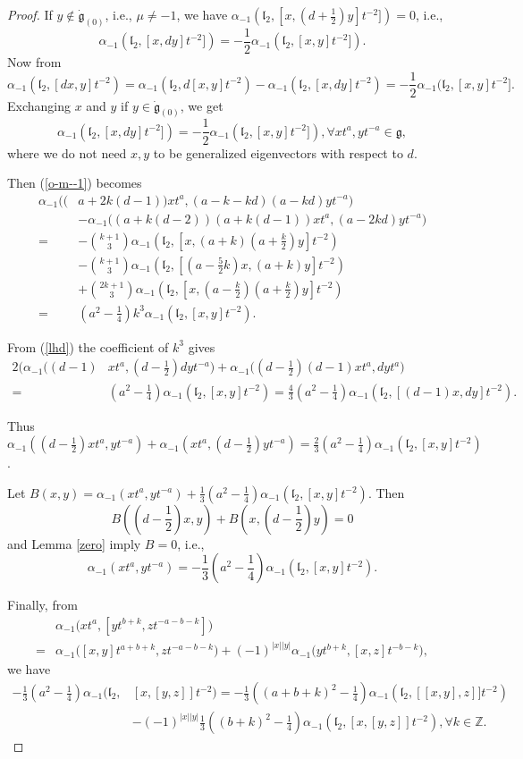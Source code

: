 \documentclass[1p]{elsarticle}
\numberwithin{equation}{section}
\def\dg{\dot{\mathfrak{g}}}
\def\fg{\mathfrak{g}}
\def\bZ{\mathbb{Z}}
\def\fl{\mathfrak{l}}
\begin{document}
\begin{proof}
If $y\not\in \dg_{(0)}$, i.e., $\mu\ne -1$,   we have $\alpha_{-1}(\fl_2,[x, (d+\frac 12)y]t^{-2}])=0$, i.e., $$\alpha_{-1}(\fl_2,[x, dy]t^{-2}])=-\frac 12 \alpha_{-1}(\fl_2,[x, y]t^{-2}]).$$ Now from $$\alpha_{-1}(\fl_2,[dx,y]t^{-2})=\alpha_{-1}(\fl_2,d[x,y]t^{-2})-\alpha_{-1}(\fl_2,[x,dy]t^{-2})=-\frac 12\alpha_{-1}(\fl_2,[x, y]t^{-2}].$$ Exchanging $x$ and $y$ if $y\in \dg_{(0)}$, we get \begin{equation}\label{2.16}\alpha_{-1}(\fl_2,[x, dy]t^{-2}])=-\frac 12 \alpha_{-1}(\fl_2,[x, y]t^{-2}]),\forall xt^a,yt^{-a}\in \fg,\end{equation}
where we do not need $x, y$ to be generalized eigenvectors with respect to $d$.


Then (\ref{o-m--1}) becomes
$$\begin{aligned}\alpha_{-1}\big((&a+2k(d-1))xt^a,(a-k-kd)(a-kd)yt^{-a}\big)\\&-\alpha_{-1}\big((a+k(d-2))(a+k(d-1))xt^a,(a-2kd)yt^{-a}\big)\\=&-\binom {k+1}3\alpha_{-1}(\fl_{2},[x,(a+k)(a+\frac k2)y]t^{-2})\\& -\binom {k+1}3\alpha_{-1}(\fl_{2},[(a-\frac 52 k)x,(a+k)y]t^{-2})\\
	&
+\binom {2k+1}3\alpha_{-1}(\fl_{2},[x,(a-\frac k2)(a+\frac k2)y]t^{-2})\\
=&(a^2-\frac 14)k^3\alpha_{-1}(\fl_2,[x,y]t^{-2}).\end{aligned}$$

From (\ref{lhd}) the coefficient of $k^3$ gives $$\begin{aligned} 2\Big(\alpha_{-1}((d-1)&xt^a, (d-\frac 12)dyt^{-a})+\alpha_{-1}((d-\frac 12)(d-1)xt^a,dyt^a\Big)\\ =&(a^2-\frac 14)\alpha_{-1}(\fl_2,[x,y]t^{-2})=\frac 43 (a^2-\frac 14)\alpha_{-1}(\fl_2,[(d-1)x,dy]t^{-2}).\end{aligned}$$

Thus $\alpha_{-1}((d-\frac 12)xt^a,yt^{-a})+\alpha_{-1}(xt^a,(d-\frac 12)yt^{-a})=\frac 23(a^2-\frac 14)\alpha_{-1}(\fl_2,[x,y]t^{-2})$.

Let $B(x,y)=\alpha_{-1}(xt^a,yt^{-a})+\frac 13(a^2-\frac 14)\alpha_{-1}(\fl_2,[x,y]t^{-2})$. Then $$B((d-\frac 12)x,y)+B(x,(d-\frac 12)y)=0$$ and Lemma \ref{zero} imply $B=0$, i.e.,
\begin{equation}\alpha_{-1}(xt^a,yt^{-a})=-\frac 13(a^2-\frac 14)\alpha_{-1}(\fl_2,[x,y]t^{-2}).\end{equation}

Finally, from $$\begin{aligned}&\alpha_{-1}\big(xt^a,[yt^{b+k},zt^{-a-b-k}]\big)\\
	=&\alpha_{-1}\big([x,y]t^{a+b+k},zt^{-a-b-k}\big)+(-1)^{|x||y|}\alpha_{-1}\big(yt^{b+k},[x,z]t^{-b-k}\big),\end{aligned}$$ we have
$$\begin{aligned}-\frac 13(a^2-\frac 14)\alpha_{-1}(\fl_2,&[x,[y,z]]t^{-2})=-\frac 13((a+b+k)^2-\frac 14)\alpha_{-1}(\fl_2,[[x,y],z]]t^{-2})\\ &-(-1)^{|x||y|}\frac 13((b+k)^2-\frac 14)\alpha_{-1}(\fl_2,[x,[y,z]]t^{-2}),\forall k\in \bZ.\end{aligned}$$


\end{proof}
\end{document}
